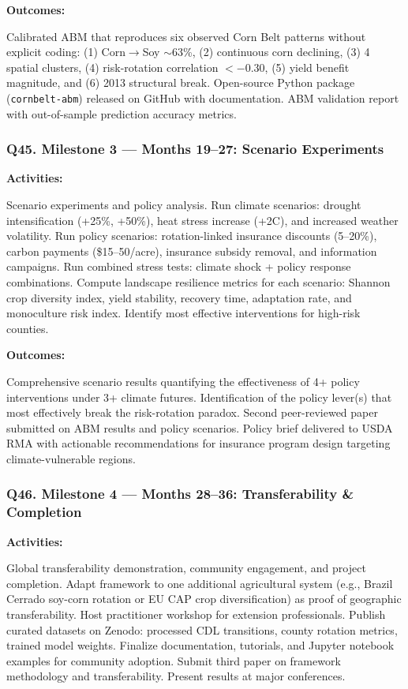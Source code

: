\documentclass[11pt,letterpaper]{article}
\newcommand{\answer}[1]{%
    \vspace{0.2em}%
    \noindent\colorbox{answerbox}{\parbox{\dimexpr\textwidth-2\fboxsep}{%
        \vspace{0.4em}#1\vspace{0.4em}%
    }}%
    \vspace{0.5em}%
}
\begin{document}
\textbf{Outcomes:}
\answer{Calibrated ABM that reproduces six observed Corn Belt patterns without explicit coding: (1) Corn$\to$Soy ${\sim}$63\%, (2) continuous corn declining, (3) 4 spatial clusters, (4) risk-rotation correlation $< -0.30$, (5) yield benefit magnitude, and (6) 2013 structural break. Open-source Python package (\texttt{cornbelt-abm}) released on GitHub with documentation. ABM validation report with out-of-sample prediction accuracy metrics.}

\subsubsection{Q45. Milestone 3 --- Months 19--27: Scenario Experiments}

\textbf{Activities:}
\answer{Scenario experiments and policy analysis. Run climate scenarios: drought intensification (+25\%, +50\%), heat stress increase (+2\textdegree C), and increased weather volatility. Run policy scenarios: rotation-linked insurance discounts (5--20\%), carbon payments (\$15--50/acre), insurance subsidy removal, and information campaigns. Run combined stress tests: climate shock + policy response combinations. Compute landscape resilience metrics for each scenario: Shannon crop diversity index, yield stability, recovery time, adaptation rate, and monoculture risk index. Identify most effective interventions for high-risk counties.}

\textbf{Outcomes:}
\answer{Comprehensive scenario results quantifying the effectiveness of 4+ policy interventions under 3+ climate futures. Identification of the policy lever(s) that most effectively break the risk-rotation paradox. Second peer-reviewed paper submitted on ABM results and policy scenarios. Policy brief delivered to USDA RMA with actionable recommendations for insurance program design targeting climate-vulnerable regions.}

\subsubsection{Q46. Milestone 4 --- Months 28--36: Transferability \& Completion}

\textbf{Activities:}
\answer{Global transferability demonstration, community engagement, and project completion. Adapt framework to one additional agricultural system (e.g., Brazil Cerrado soy-corn rotation or EU CAP crop diversification) as proof of geographic transferability. Host practitioner workshop for extension professionals. Publish curated datasets on Zenodo: processed CDL transitions, county rotation metrics, trained model weights. Finalize documentation, tutorials, and Jupyter notebook examples for community adoption. Submit third paper on framework methodology and transferability. Present results at major conferences.}
\end{document}
